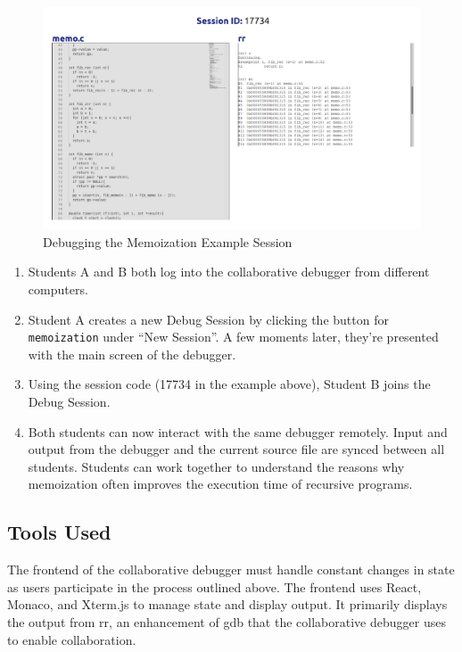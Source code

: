 \documentclass[12pt]{article}
\begin{document}
\begin{figure}[h!]

  \includegraphics[width=\textwidth]{memoization}
  \centering
  \caption{Debugging the Memoization Example Session}
  \label{frontend:rrterm}
\end{figure}

\begin{enumerate}
\item Students A and B both log into the collaborative debugger from
  different computers.
\item Student A creates a new Debug Session by clicking the button for
  \lstinline{memoization} under ``New Session''.  A few moments later,
  they're presented with the main screen of the debugger.
\item Using the session code (17734 in the example above), Student B
  joins the Debug Session.
\item Both students can now interact with the same debugger remotely.
  Input and output from the debugger and the current source file are
  synced between all students.  Students can work together to
  understand the reasons why memoization often improves the execution
  time of recursive programs.
\end{enumerate}

\subsection{Tools Used}

The frontend of the collaborative debugger must handle constant
changes in state as users participate in the process outlined above.
The frontend uses React, Monaco, and Xterm.js to manage state and
display output.  It primarily displays the output from rr, an
enhancement of gdb that the collaborative debugger uses to enable
collaboration.
\end{document}
